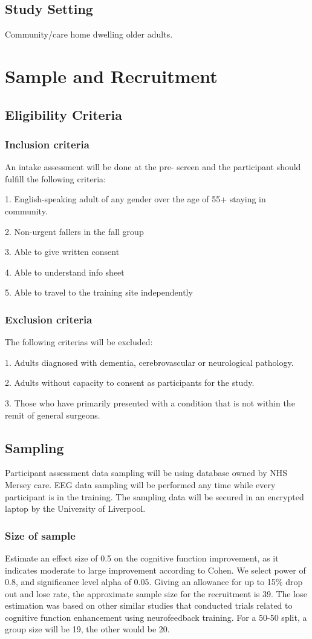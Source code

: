 \documentclass{article}
\begin{document}
\subsection{Study Setting}
Community/care home dwelling older adults.
\section{Sample and Recruitment}
\subsection{Eligibility Criteria}
\subsubsection{Inclusion criteria}
An intake assessment will be done at the pre- screen and the participant should fulfill the following criteria:

1. English-speaking adult of any gender over the age of 55+ staying in community. 

2. Non-urgent fallers in the fall group

3. Able to give written consent

4. Able to understand info sheet

5. Able to travel to the training site independently


 
\subsubsection{Exclusion criteria}
The following criterias will be excluded:

1. Adults diagnosed with dementia, cerebrovascular or neurological pathology.

2. Adults without capacity to consent as participants for the study.

3. Those who have primarily presented with a condition that is not within the remit of general surgeons.

\subsection{Sampling}
Participant assessment data sampling will be using database owned by NHS Mersey care.
EEG data sampling will be performed any time while every participant is in the training. The sampling data will be secured in an encrypted laptop by the University of Liverpool.

\subsubsection{Size of sample}
Estimate an effect size of 0.5 on the cognitive function improvement, as it indicates moderate to large improvement according to Cohen. We select power of 0.8, and significance level alpha of 0.05. Giving an allowance for up to 15\% drop out and lose rate, the approximate sample size for the recruitment is 39. The lose estimation was based on other similar studies that conducted trials related to cognitive function enhancement using neurofeedback training. For a 50-50 split, a group size will be 19, the other would be 20. 
\end{document}
